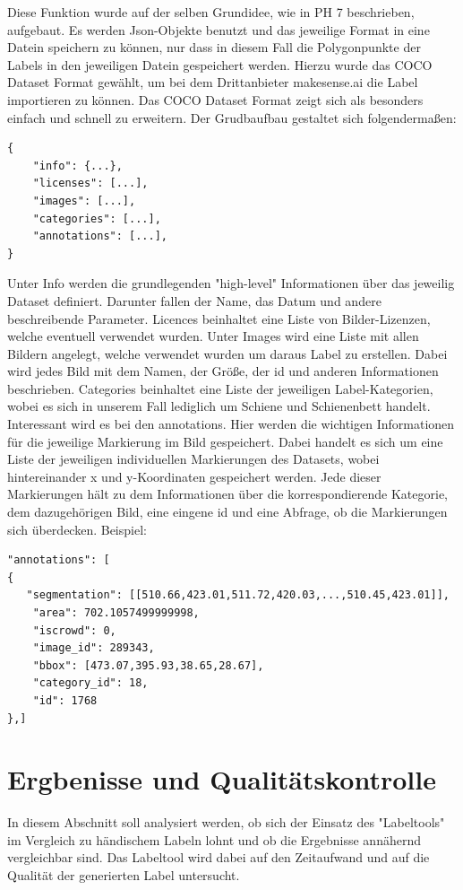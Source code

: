 \documentclass[11pt]{scrartcl}
\begin{document}
\noindent
Diese Funktion wurde auf der selben Grundidee, wie in PH 7 beschrieben, aufgebaut. Es werden Json-Objekte benutzt und das jeweilige Format in eine Datein speichern zu können, nur dass in diesem Fall die Polygonpunkte der Labels in den jeweiligen Datein gespeichert werden. Hierzu wurde das COCO Dataset Format gewählt, um bei dem Drittanbieter makesense.ai die Label importieren zu können. Das COCO Dataset Format zeigt sich als besonders einfach und schnell zu erweitern. Der Grudbaufbau gestaltet sich folgendermaßen:
\begin{lstlisting}  
{
    "info": {...},
    "licenses": [...],
    "images": [...],
    "categories": [...], 
    "annotations": [...],
}
\end{lstlisting}
Unter Info werden die grundlegenden "high-level" Informationen über das jeweilig Dataset definiert. Darunter fallen der Name, das Datum und andere beschreibende Parameter. Licences beinhaltet eine Liste von Bilder-Lizenzen, welche eventuell verwendet wurden. Unter Images wird eine Liste mit allen Bildern angelegt, welche verwendet wurden um daraus Label zu erstellen. Dabei wird jedes Bild mit dem Namen, der Größe, der id und anderen Informationen beschrieben. Categories beinhaltet eine Liste der jeweiligen Label-Kategorien, wobei es sich in unserem Fall lediglich um Schiene und Schienenbett handelt. Interessant wird es bei den annotations. Hier werden die wichtigen Informationen für die jeweilige Markierung im Bild gespeichert. Dabei handelt es sich um eine Liste der jeweiligen individuellen Markierungen des Datasets, wobei hintereinander x und y-Koordinaten gespeichert werden. Jede dieser Markierungen hält zu dem Informationen über die korrespondierende Kategorie, dem dazugehörigen Bild, eine eingene id und eine Abfrage, ob die Markierungen sich überdecken. Beispiel:
\begin{lstlisting}  
"annotations": [
{
   "segmentation": [[510.66,423.01,511.72,420.03,...,510.45,423.01]],
    "area": 702.1057499999998,
    "iscrowd": 0,
    "image_id": 289343,
    "bbox": [473.07,395.93,38.65,28.67],
    "category_id": 18,
    "id": 1768
},]
\end{lstlisting}

\noindent
\section{Ergbenisse und Qualitätskontrolle}
\label{sec:Ergebnisse und Qualitätskontrolle}

\noindent
In diesem Abschnitt soll analysiert werden, ob sich der Einsatz des "Labeltools" im Vergleich zu händischem Labeln lohnt und ob die Ergebnisse annähernd vergleichbar sind. Das Labeltool wird dabei auf den Zeitaufwand und auf die Qualität der generierten Label untersucht.
\noindent
\end{document}
